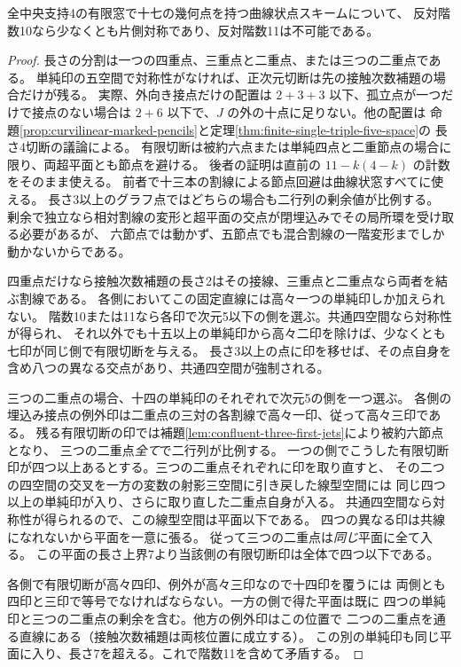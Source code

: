 \begin{theorem}\label{thm:finite-seventeen-site-pencils}
全中央支持4の有限窓で十七の幾何点を持つ曲線状点スキームについて、
反対階数10なら少なくとも片側対称であり、反対階数11は不可能である。
\end{theorem}
\begin{proof}
長さの分割は一つの四重点、三重点と二重点、または三つの二重点である。
単純印の五空間で対称性がなければ、正次元切断は先の接触次数補題の場合だけが残る。
実際、外向き接点だけの配置は $2+3+3$ 以下、孤立点が一つだけで接点のない場合は
$2+6$ 以下で、$J$ の外の十点に足りない。他の配置は
命題\ref{prop:curvilinear-marked-pencils}と定理\ref{thm:finite-single-triple-five-space}の
長さ4切断の議論による。
有限切断は被約六点または単純四点と二重節点の場合に限り、両超平面とも節点を避ける。
後者の証明は直前の $11-k(4-k)$ の計数をそのまま使える。
前者で十三本の割線による節点回避は曲線状窓すべてに使える。
長さ3以上のグラフ点ではどちらの場合も二行列の剰余値が比例する。
剰余で独立なら相対割線の変形と超平面の交点が閉埋込みでその局所環を受け取る必要があるが、
六節点では動かず、五節点でも混合割線の一階変形までしか動かないからである。

四重点だけなら接触次数補題の長さ2はその接線、三重点と二重点なら両者を結ぶ割線である。
各側においてこの固定直線には高々一つの単純印しか加えられない。
階数10または11なら各印で次元5以下の側を選ぶ。共通四空間なら対称性が得られ、
それ以外でも十五以上の単純印から高々二印を除けば、少なくとも七印が同じ側で有限切断を与える。
長さ3以上の点に印を移せば、その点自身を含め八つの異なる交点があり、共通四空間が強制される。

三つの二重点の場合、十四の単純印のそれぞれで次元5の側を一つ選ぶ。
各側の埋込み接点の例外印は二重点の三対の各割線で高々一印、従って高々三印である。
残る有限切断の印では補題\ref{lem:confluent-three-first-jets}により被約六節点となり、
三つの二重点\emph{全て}で二行列が比例する。
一つの側でこうした有限切断印が四つ以上あるとする。三つの二重点それぞれに印を取り直すと、
その二つの四空間の交叉を一方の変数の射影三空間に引き戻した線型空間には
同じ四つ以上の単純印が入り、さらに取り直した二重点自身が入る。
共通四空間なら対称性が得られるので、この線型空間は平面以下である。
四つの異なる印は共線になれないから平面を一意に張る。
従って三つの二重点は\emph{同じ}平面に全て入る。
この平面の長さ上界7より当該側の有限切断印は全体で四つ以下である。

各側で有限切断が高々四印、例外が高々三印なので十四印を覆うには
両側とも四印と三印で等号でなければならない。一方の側で得た平面は既に
四つの単純印と三つの二重点の剰余を含む。他方の例外印はこの位置で
二つの二重点を通る直線にある（接触次数補題は両核位置に成立する）。
この別の単純印も同じ平面に入り、長さ7を超える。これで階数11を含めて矛盾する。
\end{proof}
